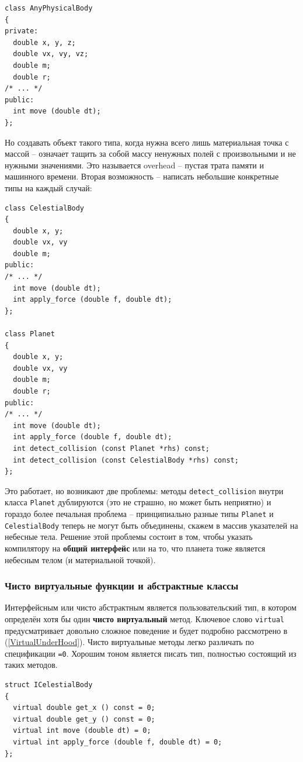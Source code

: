 \documentclass[a4paper,12pt,oneside]{article}
\begin{document}
\begin{lstlisting}
class AnyPhysicalBody
{
private:
  double x, y, z;
  double vx, vy, vz;
  double m;
  double r;
/* ... */
public:
  int move (double dt);
};
\end{lstlisting}

Но создавать объект такого типа, когда нужна всего лишь материальная точка с массой -- означает тащить за собой массу ненужных полей с произвольными и не нужными значениями. Это называется overhead -- пустая трата памяти и машинного времени. Вторая возможность -- написать небольшие конкретные типы на каждый случай:

\begin{lstlisting}
class CelestialBody
{
  double x, y;
  double vx, vy
  double m;
public:
/* ... */
  int move (double dt);
  int apply_force (double f, double dt);
};

class Planet
{
  double x, y;
  double vx, vy
  double m;
  double r;
public:
/* ... */
  int move (double dt);
  int apply_force (double f, double dt);
  int detect_collision (const Planet *rhs) const;
  int detect_collision (const CelestialBody *rhs) const;
};
\end{lstlisting}

Это работает, но возникают две проблемы: методы \lstinline!detect_collision! внутри класса \lstinline!Planet! дублируются (это не страшно, но может быть неприятно) и гораздо более печальная проблема -- принципиально разные типы \lstinline!Planet! и \lstinline!CelestialBody! теперь не могут быть объединены, скажем в массив указателей на небесные тела. Решение этой проблемы состоит в том, чтобы указать компилятору на \textbf{общий интерфейс} или на то, что планета тоже является небесным телом (и материальной точкой).

\subsubsection{Чисто виртуальные функции и абстрактные классы}\label{PureVirtual}

Интерфейсным или чисто абстрактным является пользовательский тип, в котором определён хотя бы один \textbf{чисто виртуальный} метод. Ключевое слово \lstinline!virtual! предусматривает довольно сложное поведение и будет подробно рассмотрено в (\ref{VirtualUnderHood}). Чисто виртуальные методы легко различать по спецификации \lstinline!=0!. Хорошим тоном является писать тип, полностью состоящий из таких методов.

\begin{lstlisting}
struct ICelestialBody
{
  virtual double get_x () const = 0;
  virtual double get_y () const = 0;
  virtual int move (double dt) = 0;
  virtual int apply_force (double f, double dt) = 0;
};
\end{lstlisting}
\end{document}
